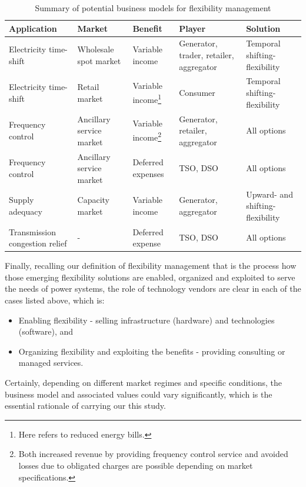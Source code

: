 \begin{table}[h!]
	\centering
	\begin{tabular}{L{2.5cm} L{2.5cm} L{2.5cm} L{2.5cm} L{3cm} }
		\hline
		\hline
		Application & Market & Benefit & Player & Solution \\
		\hline
		\hline
		Electricity time-shift & Wholesale spot market & Variable income & Generator, trader, retailer, aggregator & Temporal shifting-flexibility \\
		\hline
		Electricity time-shift & Retail market & Variable income\footnote{Here refers to reduced energy bills.} & Consumer & Temporal shifting-flexibility \\
		\hline
		Frequency control & Ancillary service market & Variable income\footnote{Both increased revenue by providing frequency control service and avoided losses due to obligated charges are possible depending on market specifications.} & Generator, retailer, aggregator & All options \\
		\hline
		Frequency control & Ancillary service market & Deferred expenses & TSO, DSO & All options \\
		\hline
		Supply adequacy & Capacity market & Variable income & Generator, aggregator & Upward- and shifting- flexibility\\
		\hline
		Transmission congestion relief & - & Deferred expense & TSO, DSO & All options \\
		\hline
		\hline
	\end{tabular}
\caption{Summary of potential business models for flexibility management}\label{tab:summary-biz-model}
\end{table}

Finally, recalling our definition of flexibility management that is the process how those emerging flexibility solutions are enabled, organized and exploited to serve the needs of power systems, the role of technology vendors are clear in each of the cases listed above, which is:

\begin{itemize}
	\item Enabling flexibility - selling infrastructure (hardware) and technologies (software), and 
	\item Organizing flexibility and exploiting the benefits - providing consulting or managed services.
\end{itemize}

Certainly, depending on different market regimes and specific conditions, the business model and associated values could vary significantly, which is the essential rationale of carrying our this study.

